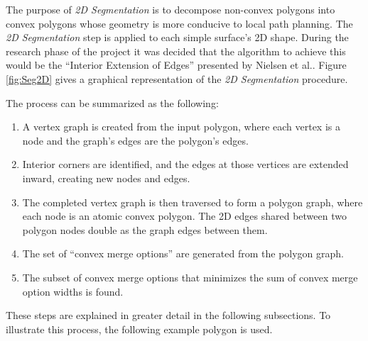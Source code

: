 The purpose of \textit{2D Segmentation} is to decompose non-convex polygons into convex polygons whose geometry is more conducive to local path planning.
The \textit{2D Segmentation} step is applied to each simple surface's 2D shape.
During the research phase of the project it was decided that the algorithm to achieve this would be the ``Interior Extension of Edges'' presented by Nielsen et al.\cite{IntEdgeExt}.
Figure \ref{fig:Seg2D} gives a graphical representation of the \textit{2D Segmentation} procedure.

The process can be summarized as the following:
\begin{enumerate}
	\item A vertex graph is created from the input polygon, where each vertex is a node and the graph's edges are the polygon's edges.
	\item Interior corners are identified, and the edges at those vertices are extended inward, creating new nodes and edges.
	\item The completed vertex graph is then traversed to form a polygon graph, where each node is an atomic convex polygon.
		The 2D edges shared between two polygon nodes double as the graph edges between them.
	\item The set of ``convex merge options'' are generated from the polygon graph.
	\item The subset of convex merge options that minimizes the sum of convex merge option widths is found.
\end{enumerate}
These steps are explained in greater detail in the following subsections.
To illustrate this process, the following example polygon is used.


